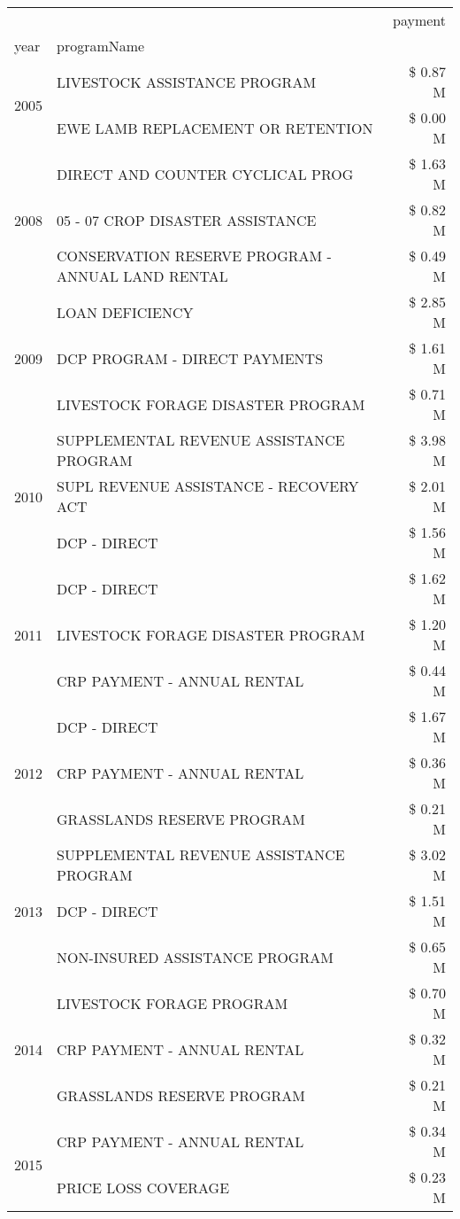 \begin{tabular}{llr}
\toprule
 &  & payment \\
year & programName &  \\
\midrule
\multirow[t]{2}{*}{2005} & LIVESTOCK ASSISTANCE PROGRAM & \$ 0.87 M \\
 & EWE LAMB REPLACEMENT OR RETENTION & \$ 0.00 M \\
\cline{1-3}
\multirow[t]{3}{*}{2008} & DIRECT AND COUNTER CYCLICAL PROG & \$ 1.63 M \\
 & 05 - 07 CROP DISASTER ASSISTANCE & \$ 0.82 M \\
 & CONSERVATION RESERVE PROGRAM - ANNUAL LAND RENTAL & \$ 0.49 M \\
\cline{1-3}
\multirow[t]{3}{*}{2009} & LOAN DEFICIENCY & \$ 2.85 M \\
 & DCP PROGRAM - DIRECT PAYMENTS & \$ 1.61 M \\
 & LIVESTOCK FORAGE DISASTER  PROGRAM & \$ 0.71 M \\
\cline{1-3}
\multirow[t]{3}{*}{2010} & SUPPLEMENTAL REVENUE ASSISTANCE PROGRAM & \$ 3.98 M \\
 & SUPL REVENUE ASSISTANCE - RECOVERY ACT & \$ 2.01 M \\
 & DCP - DIRECT & \$ 1.56 M \\
\cline{1-3}
\multirow[t]{3}{*}{2011} & DCP - DIRECT & \$ 1.62 M \\
 & LIVESTOCK FORAGE DISASTER PROGRAM & \$ 1.20 M \\
 & CRP PAYMENT - ANNUAL RENTAL & \$ 0.44 M \\
\cline{1-3}
\multirow[t]{3}{*}{2012} & DCP - DIRECT & \$ 1.67 M \\
 & CRP PAYMENT - ANNUAL RENTAL & \$ 0.36 M \\
 & GRASSLANDS RESERVE PROGRAM & \$ 0.21 M \\
\cline{1-3}
\multirow[t]{3}{*}{2013} & SUPPLEMENTAL REVENUE ASSISTANCE PROGRAM & \$ 3.02 M \\
 & DCP - DIRECT & \$ 1.51 M \\
 & NON-INSURED ASSISTANCE PROGRAM & \$ 0.65 M \\
\cline{1-3}
\multirow[t]{3}{*}{2014} & LIVESTOCK FORAGE PROGRAM & \$ 0.70 M \\
 & CRP PAYMENT - ANNUAL RENTAL & \$ 0.32 M \\
 & GRASSLANDS RESERVE PROGRAM & \$ 0.21 M \\
\cline{1-3}
\multirow[t]{3}{*}{2015} & CRP PAYMENT - ANNUAL RENTAL & \$ 0.34 M \\
 & PRICE LOSS COVERAGE & \$ 0.23 M \\

\end{tabular}
